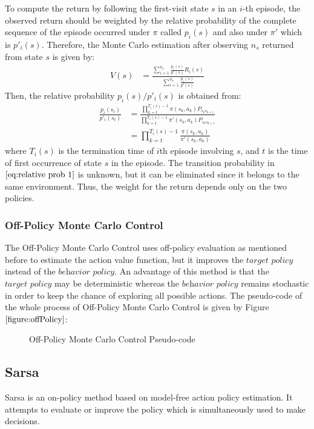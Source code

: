 \documentclass[paper=a4, fontsize=11pt]{scrartcl}
\numberwithin{equation}{section}		%
\numberwithin{figure}{section}			%
\numberwithin{table}{section}				%
\begin{document}
To compute the return by following the first-visit state $s$ in an  $i$-th episode, the observed return should be weighted by the relative probability of the complete sequence of the episode occurred under $\pi$ called $p_i(s)$ and also under $\pi'$ which is $p'_i(s)$. Therefore, the Monte Carlo estimation after observing $n_s$ returned from state $s$ is given by:
\begin{align}
V(s) &= \frac{\sum_{i=1}^{n_s}\frac{p_i(s)}{p'(s)}R_i(s)}{\sum_{i=1}^{n_s}\frac{p_i(s)}{p'(s)}}
\end{align} 
Then, the relative probability $p_i(s)/p'_i(s)$ is obtained from:
\begin{align}
\frac{p_i(s_t)}{p'_i(s_t)} &= \frac{\prod_{k=t}^{T_i(s)-1}\pi(s_k,a_k)P_{s_ks_{k+1}}}{\prod_{k=t}^{T_i(s)-1}\pi'(s_k,a_k)P_{s_ks_{k+1}}} \label{eq:relative prob 1} \\
&= \prod_{k=t}^{T_i(s)-1}\frac{\pi(s_k,a_k)}{\pi'(s_k,a_k)} 
\end{align}
where $T_i(s)$ is the termination time of $i$th episode involving $s$, and $t$ is the time of first occurrence of state $s$ in the episode. The transition probability in $\eqref{eq:relative prob 1}$ is unknown, but it can be eliminated since it belongs to the same environment. Thus, the weight for the return depends only on the two policies.

\subsubsection*{Off-Policy Monte Carlo Control}
The Off-Policy Monte Carlo Control uses off-policy evaluation as mentioned before to estimate the action value function, but it improves the $\textit{target policy}$ instead of the $\textit{behavior policy}$. An advantage of this method is that the $\textit{target policy}$ may be deterministic whereas the $\textit{behavior policy}$ remains stochastic in order to keep the chance of exploring all possible actions. The pseudo-code of the whole process of Off-Policy Monte Carlo Control is given by Figure $\ref{figure:offPolicy}$:

\begin{figure}[H] \centering
\caption{Off-Policy Monte Carlo Control Pseudo-code} \label{figure:offPolicy}
\end{figure}


\subsection{\textbf {Sarsa}}
Sarsa is an on-policy method based on model-free action policy estimation. It attempts to evaluate or improve the policy which is simultaneously used to make decisions.
\end{document}
